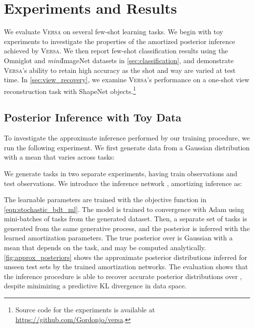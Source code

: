 \documentclass{article}
\newcommand{\Versa}{\textsc{Versa}}
\begin{document}
\section{Experiments and Results}
\label{sec:experiments}

We evaluate \Versa{} on several few-shot learning tasks. We begin with toy experiments to investigate the properties of the amortized posterior inference achieved by \Versa{}. We then report few-shot classification results using the Omniglot and \textit{mini}ImageNet datasets in \cref{sec:classification}, and demonstrate \Versa{}'s ability to retain high accuracy as the shot and way are varied at test time. In \cref{sec:view_recovery}, we examine \Versa{}'s performance on a one-shot view reconstruction task with ShapeNet objects.\footnote{Source code for the experiments is available at \url{https://github.com/Gordonjo/versa}.}

\subsection{Posterior Inference with Toy Data}
\label{sec:toy_experiment}

To investigate the approximate inference performed by our training procedure, we run the following experiment. We first generate data from a Gaussian distribution with a mean that varies across tasks:

We generate  tasks in two separate experiments, having  train observations and  test observations. We introduce the inference network , amortizing inference as:

The learnable parameters  are trained with the objective function in \cref{eqn:stochastic_bdt_ml}. The model is trained to convergence with Adam \citep{kingma2014adam} using mini-batches of tasks from the generated dataset. Then, a separate set of tasks is generated from the same generative process, and the posterior  is inferred with the learned amortization parameters. The true posterior over  is Gaussian with a mean that depends on the task, and may be computed analytically. \cref{fig:approx_posteriors} shows the approximate posterior distributions inferred for unseen test sets by the trained amortization networks. The evaluation shows that the inference procedure is able to recover accurate posterior distributions over , despite minimizing a predictive KL divergence in data space.
\end{document}
